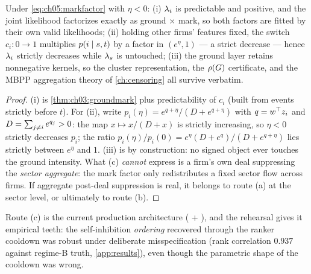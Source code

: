 \begin{proposition}\label{prop:ch05:cooldown}
Under \cref{eq:ch05:markfactor} with $\eta < 0$: (i) $\lambda_i$ is
predictable and positive, and the joint likelihood factorizes exactly as
ground $\times$ mark, so both factors are fitted by their own valid
likelihoods; (ii) holding other firms' features fixed, the switch $c_i: 0
\to 1$ multiplies $p(i \mid s,t)$ by a factor in $(e^{\eta}, 1)$ --- a
strict decrease --- hence $\lambda_i$ strictly decreases while $\lambda_s$ is
untouched; (iii) the ground layer retains nonnegative kernels, so the
cluster representation, the $\rho\!\left(G\right)$ certificate, and the MBPP
aggregation theory of \cref{ch:censoring} all survive verbatim.
\end{proposition}

\begin{proof}
(i) is \cref{thm:ch03:groundmark} plus predictability of $c_i$ (built
from events strictly before $t$). For (ii), write $p_i(\eta) =
e^{q+\eta}/(D + e^{q+\eta})$ with $q = w^\top z_i$ and $D =
\sum_{j\ne i} e^{q_j} > 0$: the map $x \mapsto x/(D+x)$ is strictly
increasing, so $\eta < 0$ strictly decreases $p_i$; the ratio
$p_i(\eta)/p_i(0) = e^{\eta}(D + e^{q})/(D + e^{q+\eta})$ lies strictly
between $e^{\eta}$ and $1$. (iii) is by construction: no signed object
ever touches the ground intensity. What (c) \emph{cannot} express is a
firm's own deal suppressing the \emph{sector aggregate}: the mark factor
only redistributes a fixed sector flow across firms. If aggregate
post-deal suppression is real, it belongs to route (a) at the sector
level, or ultimately to route (b).
\end{proof}

Route (c) is the current production architecture
( + ), and the
rehearsal gives it empirical teeth: the self-inhibition \emph{ordering}
recovered through the ranker cooldown was robust under deliberate
misspecification (rank correlation $0.937$ against regime-B truth,
\cref{app:results}), even though the parametric shape of the cooldown was
wrong.

